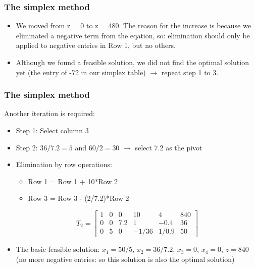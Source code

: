 \documentclass[11pt,table,final,fleqn,xcolor={usenames,dvipsnames,table}]{beamer}
\begin{document}
\begin{frame}
  \frametitle{The simplex method}
  \begin{itemize}
    \item We moved from z = 0 to z = 480. The reason for the increase is because we eliminated a negative term from the eqation, so: elimination should only be applied to negative entries in Row 1, but no others.
    \item Although we found a feasible solution, we did not find the optimal solution yet (the entry of -72 in our simplex table) $\longrightarrow$ repeat step 1 to 3. 
  \end{itemize}
\end{frame}

\begin{frame}
  \frametitle{The simplex method}
  Another iteration is required:
  \begin{itemize}
    \item Step 1: Select column 3
    \item Step 2: $36/7.2 = 5$ and $60/2 = 30$ $\longrightarrow$ select 7.2 as the pivot
    \item Elimination by row operations:
    \begin{itemize}
      \item Row 1 = Row 1 + 10*Row 2
      \item Row 3 = Row 3 - (2/7.2)*Row 2
    \end{itemize}
       \[
T_2 = \begin{bmatrix}
1 & 0 & 0 & 10 & 4 & 840\\ 
0 & 0 & 7.2 & 1 & -0.4 & 36\\
0 & 5 & 0 & -1/36 & 1/0.9 &50 
\end{bmatrix}
   \]
    \item The basic feasible solution: $x_1 = 50/5$, $x_2 = 36/7.2$, $x_3 = 0$, $x_4 = 0$, $z=840$ (no more negative entries: so this solution is also the optimal solution)
  \end{itemize}
\end{frame}
\end{document}
